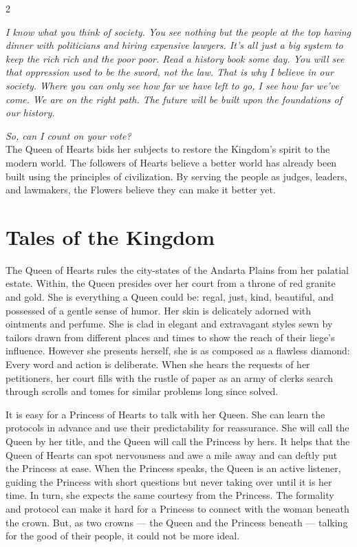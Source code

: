\label{scha:Hearts}\begin{multicols}{2}\raggedcolumns

\noindent\textit{I know what you think of society. You see nothing but the people at the top having dinner with politicians and hiring expensive lawyers. It's all just a big system to keep the rich rich and the poor poor. Read a history book some day. You will see that oppression used to be the sword, not the law. That is why I believe in our society. Where you can only see how far we have left to go, I see how far we've come. We are on the right path. The future will be built upon the foundations of our history.}

\textit{So, can I count on your vote?}\\

\noindent The Queen of Hearts bids her subjects to restore the Kingdom's spirit to the modern world. The followers of Hearts believe a better world has already been built using the principles of civilization. By serving the people as judges, leaders, and lawmakers, the Flowers believe they can make it better yet. 

\section*{Tales of the Kingdom}

The Queen of Hearts rules the city-states of the Andarta Plains from her palatial estate. Within, the Queen presides over her court from a throne of red granite and gold. She is everything a Queen could be: regal, just, kind, beautiful, and possessed of a gentle sense of humor. Her skin is delicately adorned with ointments and perfume. She is clad in elegant and extravagant styles sewn by tailors drawn from different places and times to show the reach of their liege's influence. However she presents herself, she is as composed as a flawless diamond: Every word and action is deliberate. When she hears the requests of her petitioners, her court fills with the rustle of paper as an army of clerks search through scrolls and tomes for similar problems long since solved.

It is easy for a Princess of Hearts to talk with her Queen. She can learn the protocols in advance and use their predictability for reassurance. She will call the Queen by her title, and the Queen will call the Princess by hers. It helps that the Queen of Hearts can spot nervousness and awe a mile away and can deftly put the Princess at ease. When the Princess speaks, the Queen is an active listener, guiding the Princess with short questions but never taking over until it is her time. In turn, she expects the same courtesy from the Princess. The formality and protocol can make it hard for a Princess to connect with the woman beneath the crown. But, as two crowns — the Queen and the Princess beneath — talking for the good of their people, it could not be more ideal.


\end{multicols}
